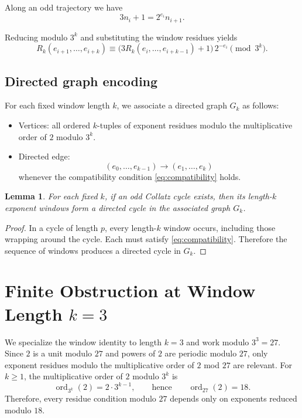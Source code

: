 \documentclass[11pt]{article}
\theoremstyle{definition}
\theoremstyle{plain}
\newtheorem{lemma}[theorem]{Lemma}
\theoremstyle{remark}
\begin{document}
Along an odd trajectory we have
\[
3n_i + 1 = 2^{e_i} n_{i+1}.
\]

Reducing modulo $3^k$ and substituting the window residues yields
\begin{equation}\label{eq:compatibility}
R_k(e_{i+1},\dots,e_{i+k})
\equiv
\bigl(3R_k(e_i,\dots,e_{i+k-1}) + 1\bigr)\,
2^{-e_i}
\pmod{3^k}.
\end{equation}

\subsection{Directed graph encoding}

For each fixed window length $k$, we associate a directed graph $G_k$ as follows:

\begin{itemize}
\item Vertices: all ordered $k$-tuples of exponent residues modulo
the multiplicative order of $2$ modulo $3^k$.
\item Directed edge:
\[
(e_0,\dots,e_{k-1}) \longrightarrow (e_1,\dots,e_k)
\]
whenever the compatibility condition \eqref{eq:compatibility} holds.
\end{itemize}

\begin{lemma}\label{lem:cycle_to_Gk}
For each fixed $k$, if an odd Collatz cycle exists, then its length-$k$
exponent windows form a directed cycle in the associated graph $G_k$.
\end{lemma}

\begin{proof}
In a cycle of length $p$, every length-$k$ window occurs,
including those wrapping around the cycle.
Each must satisfy \eqref{eq:compatibility}.
Therefore the sequence of windows produces a directed cycle in $G_k$.
\end{proof}

\section{Finite Obstruction at Window Length $k=3$}\label{sec:k3}

We specialize the window identity to length $k=3$ and work modulo $3^3=27$.
Since $2$ is a unit modulo $27$ and powers of $2$ are periodic modulo $27$,
only exponent residues modulo the multiplicative order of $2$ mod $27$
are relevant. For $k\ge 1$, the multiplicative order of $2$ modulo $3^k$ is
\[
\operatorname{ord}_{3^k}(2)=2\cdot 3^{k-1},
\qquad\text{hence}\qquad
\operatorname{ord}_{27}(2)=18.
\]
Therefore, every residue condition modulo $27$ depends only on exponents
reduced modulo $18$.
\end{document}

